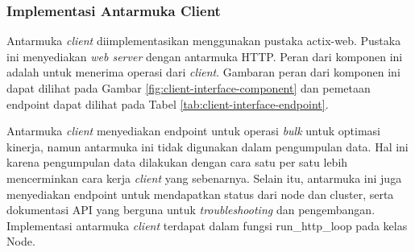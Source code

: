 \subsubsection{Implementasi Antarmuka Client}
\label{subsubsection:implementasi-antarmuka-client}

Antarmuka \textit{client} diimplementasikan menggunakan pustaka actix-web. Pustaka ini menyediakan \textit{web server} dengan antarmuka HTTP. Peran dari komponen ini adalah untuk menerima operasi dari \textit{client}. Gambaran peran dari komponen ini dapat dilihat pada Gambar \ref{fig:client-interface-component} dan pemetaan endpoint dapat dilihat pada Tabel \ref{tab:client-interface-endpoint}.

\begin{table}[h]
    \centering
    \caption{Endpoint dari Antarmuka Client}
    \label{tab:client-interface-endpoint}
\end{table}

Antarmuka \textit{client} menyediakan endpoint untuk operasi \textit{bulk} untuk optimasi kinerja, namun antarmuka ini tidak digunakan dalam pengumpulan data. Hal ini karena pengumpulan data dilakukan dengan cara satu per satu lebih mencerminkan cara kerja \textit{client} yang sebenarnya. Selain itu, antarmuka ini juga menyediakan endpoint untuk mendapatkan status dari node dan cluster, serta dokumentasi API yang berguna untuk \textit{troubleshooting} dan pengembangan. Implementasi antarmuka \textit{client} terdapat dalam fungsi run\_http\_loop pada kelas Node.

